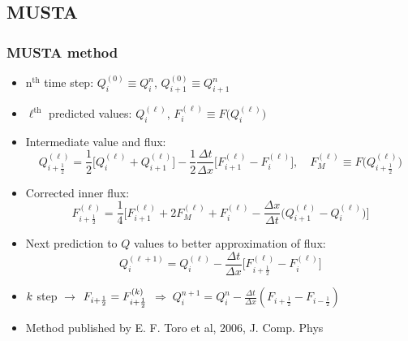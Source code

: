 \documentclass{beamer}
\begin{document}
\subsection{MUSTA}
\begin{frame}
\frametitle{MUSTA method}
\begin{itemize}
\item<1-> $\mathrm{n^{th}}$ time step: $Q^{(0)}_i\equiv Q^n_i$,  $Q^{(0)}_{i+1}\equiv Q^{n}_{i+1}$
\item<1-> $\ell^\mathrm{th}$ predicted values: $Q^{(\ell)}_{i}$, $F^{(\ell)}_{i}\equiv F\big(Q^{(\ell)}_{i}\big)$
\item<1-> Intermediate value and flux:
\begin{equation*}
Q^{(\ell)}_{i+\frac{1}{2}}=\frac{1}{2}\Big[Q^{(\ell)}_i+Q^{(\ell)}_{i+1}\Big]-\frac{1}{2}\frac{\Delta t}{\Delta x}\Big[F^{(\ell)}_{i+1}-F^{(\ell)}_i\Big], \quad F_M^{(\ell)} \equiv F\big(Q^{(\ell)}_{i+\frac{1}{2}}\big)
\end{equation*}

\item<1-> Corrected inner flux:
\begin{equation*}
F^{(\ell)}_{i+\frac{1}{2}}=\frac{1}{4}\Big[F^{(\ell)}_{i+1}+2F^{(\ell)}_M+F^{(\ell)}_{i}-\frac{\Delta x}{\Delta t}\Big(Q^{(\ell)}_{i+1}-Q^{(\ell)}_i\Big)\Big]
\end{equation*}
\item<1-> Next prediction to $Q$ values to better approximation of flux:
\begin{equation*}
Q_i^{(\ell+1)}=Q^{(\ell)}_i-\frac{\Delta t}{\Delta x}\Big[F^{(\ell)}_{i+\frac{1}{2}}-F^{(\ell)}_i\Big]
\end{equation*}
\item<1-> $\mathit\mathbf{{k}}$ step $\rightarrow$ $F_{i+\frac{1}{2}}=F_{i+\frac{1}{2}}^{(\mathit\mathbf{{k}})}$ $\Longrightarrow\; Q^{n+1}_i=Q^{n}_i-\frac{\Delta t}{\Delta x}(F_{i+\frac{1}{2}}-F_{i-\frac{1}{2}})$
\item<1-> Method published by E. F. Toro et al, 2006, J. Comp. Phys
\end{itemize}
\end{frame}
\end{document}
